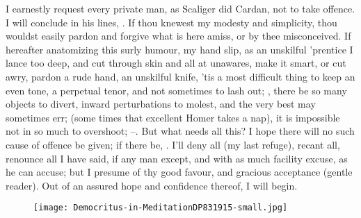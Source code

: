 I earnestly request every private man, as Scaliger did Cardan, not to take
offence. I will conclude in his lines, . If thou
knewest my modesty and simplicity, thou wouldst easily
pardon and forgive what is here amiss, or by thee misconceived. If hereafter
anatomizing this surly humour, my hand slip, as an unskilful 'prentice I lance
too deep, and cut through skin and all at unawares, make it smart, or cut awry,
pardon a rude hand, an unskilful knife, 'tis a most
difficult thing to keep an even tone, a perpetual tenor, and not sometimes to
lash out; , there be so many objects to
divert, inward perturbations to molest, and the very best may sometimes err;
 (some times that excellent Homer takes a
nap), it is impossible not in so much to overshoot; --. But what needs all this? I hope there will no such cause
of offence be given; if there be, . I'll deny all (my last
refuge), recant all, renounce all I have said, if any man except, and with as
much facility excuse, as he can accuse; but I presume of thy good favour, and
gracious acceptance (gentle reader). Out of an assured hope and confidence
thereof, I will begin.

\begin{figure}[p]
  \begingroup
  \centering
  \texttt{[image: Democritus-in-MeditationDP831915-small.jpg]}
  \label{fig:democritusinmeditation}
\end{figure}
\clearpage{}
